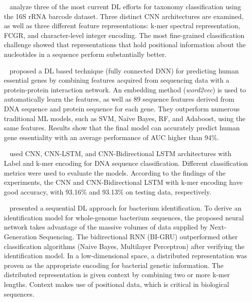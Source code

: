 \citeauthor{Helaly2019ConvolutionalStudy}~\cite{Helaly2019ConvolutionalStudy} analyze three of the most current \gls{DL} efforts for taxonomy classification using the 16S rRNA barcode dataset. Three distinct \gls{CNN} architectures are examined, as well as three different feature representations: k-mer spectral representation, \gls{FCGR}, and character-level integer encoding. The most fine-grained classification challenge showed that representations that hold positional information about the nucleotides in a sequence perform substantially better.


\citeauthor{Zhang2020DeepHE:Learning}~\cite{Zhang2020DeepHE:Learning} proposed a \gls{DL} based technique (fully connected \gls{DNN}) for predicting human essential genes by combining features acquired from sequencing data with a protein-protein interaction network. An embedding method (\textit{word2vec}) is used to automatically learn the features, as well as 89 sequence features derived from \gls{DNA} sequence and protein sequence for each gene. They outperform numerous traditional \gls{ML} models, such as \gls{SVM}, Naïve Bayes, \gls{RF}, and Adaboost, using the same features. Results show that the final model can accurately predict human gene essentiality with an average performance of AUC higher than 94\%.


\citeauthor{Gunasekaran2021AnalysisModels}~\cite{Gunasekaran2021AnalysisModels} used \gls{CNN}, \gls{CNN}-\gls{LSTM}, and \gls{CNN}-Bidirectional \gls{LSTM} architectures with Label and k-mer encoding for \gls{DNA} sequence classification. Different classification metrics were used to evaluate the models. According to the findings of the experiments, the \gls{CNN} and \gls{CNN}-Bidirectional \gls{LSTM} with k-mer encoding have good accuracy, with 93.16\% and 93.13\% on testing data, respectively.

\citeauthor{Lugo2021AIdentification}~\cite{Lugo2021AIdentification} presented a sequential \gls{DL} approach for bacterium identification. To derive an identification model for whole-genome bacterium sequences, the proposed neural network takes advantage of the massive volumes of data supplied by Next-Generation Sequencing. The bidirectional \gls{RNN} (BI-\gls{GRU}) outperformed other classification algorithms (Naive Bayes, Multilayer Perceptron) after verifying the identification model. In a low-dimensional space, a distributed representation was proven as the appropriate encoding for bacterial genetic information. The distributed representation is given context by combining two or more k-mer lengths. Context makes use of positional data, which is critical in biological sequences.

